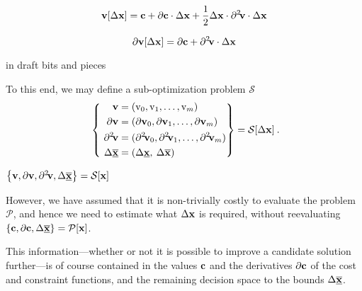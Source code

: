 \documentclass[11pt]{article}
\begin{document}
\begin{equation}
\textbf{v}[\Delta \mathbf{x}] = \mathbf{c} + \partial \mathbf{c} \cdot \Delta \mathbf{x} + \frac{1}{2} \Delta \mathbf{x} \cdot \partial^{2}\!\mathbf{v} \cdot \Delta \mathbf{x}
\end{equation}

\begin{equation}
\partial \textbf{v}[\Delta \mathbf{x}] =  \partial \mathbf{c} + \partial^{2}\!\mathbf{v} \cdot  \Delta \mathbf{x}
\end{equation}


\bigskip

in draft bits and pieces

\bigskip


To this end, we may define a sub-optimization problem $\mathcal{S}$
\begin{align}
\label{d:eqn:p}
 ~\left\{ ~
\begin{aligned}
\mathbf{v} &= (\textrm{v}_0, \textrm{v}_1, \ldots, \textrm{v}_m ) \\
\mathbf{\partial v} & = (\mathbf{\partial v}_0 , \mathbf{\partial v}_1 , \ldots,\mathbf{\partial v}_m  ) \\
\partial^{2}\!\mathbf{v} & = (\partial^2\!\mathbf{ v}_0 , \partial^2\!\mathbf{ v}_1 , \ldots,\partial^2\!\mathbf{ v}_m  ) \\
\Delta \underline{\overline{\mathbf{x}}} & = ( \Delta \underline{\mathbf{x}} , \: \Delta \overline{\mathbf{x}} ) \:
\end{aligned}\right\} =
\mathcal{S} [\Delta \mathbf{x}] \: .
\end{align}
\bigskip

 $\left\{\mathbf{v}, \partial \mathbf{v}, \partial^2\!\mathbf{ v},   \Delta \underline{\overline{\mathbf{x}}}\right\}=\mathcal{S}[\mathbf{x}]$ 



However, we have assumed that it is non-trivially costly to evaluate the problem $\mathcal{P}$, and hence we need to estimate what $\Delta\mathbf{x}$ is required, without reevaluating $\left\{\mathbf{c}, \partial \mathbf{c}, \Delta \underline{\overline{\mathbf{x}}}\right\}=\mathcal{P}[\mathbf{x}]$. 


This information---whether or not it is possible to improve a candidate solution further---is of course contained in the values $\mathbf{c}$ and the derivatives $\mathbf{\partial c}$ of the cost and constraint functions, and the remaining decision space to the bounds $\Delta \underline{\overline{\mathbf{x}}}$.
\end{document}
